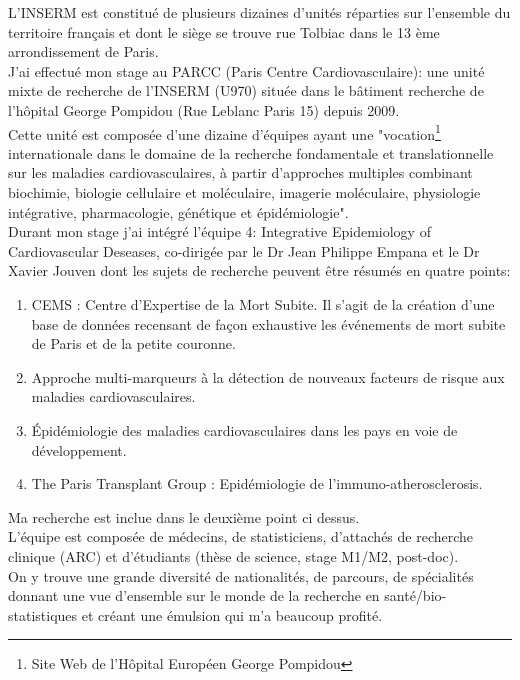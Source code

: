 \documentclass{book}
\begin{document}
\noindent
L'INSERM est constitué de plusieurs dizaines d'unités réparties sur l'ensemble du territoire français et dont le siège se trouve rue Tolbiac dans le 13 ème arrondissement de Paris.\\
J'ai effectué mon stage au PARCC (Paris Centre Cardiovasculaire): une unité mixte de recherche de l'INSERM (U970) située dans le bâtiment recherche de l'hôpital George Pompidou (Rue Leblanc Paris 15) depuis 2009.\\

\noindent
Cette unité est composée d'une dizaine d'équipes ayant une "vocation\footnote{Site Web de l'Hôpital Européen George Pompidou} internationale dans le domaine de la recherche fondamentale et translationnelle sur les maladies cardiovasculaires, à partir d'approches multiples combinant biochimie, biologie cellulaire et moléculaire, imagerie moléculaire, physiologie intégrative, pharmacologie, génétique et épidémiologie".\\

\noindent
Durant mon stage j'ai intégré l'équipe 4: Integrative Epidemiology of Cardiovascular Deseases, co-dirigée par le Dr Jean Philippe Empana et le Dr Xavier Jouven dont les sujets de recherche peuvent être résumés en quatre points:
\noindent
\begin{enumerate}
\item CEMS : Centre d'Expertise de la Mort Subite. Il s'agit de la création d'une base de données recensant de façon exhaustive les événements de mort subite de Paris et de la petite couronne.\\
\item Approche multi-marqueurs à la détection de nouveaux facteurs de risque aux maladies cardiovasculaires.\\
\item Épidémiologie des maladies cardiovasculaires dans les pays en voie de développement.\\
\item The Paris Transplant Group : Epidémiologie de l'immuno-atherosclerosis.\\
\end{enumerate}

Ma recherche est inclue dans le deuxième point ci dessus.\\

\noindent
L'équipe est composée de médecins, de statisticiens, d'attachés de recherche clinique (ARC) et d'étudiants (thèse de science, stage M1/M2, post-doc).\\
On y trouve une grande diversité de nationalités, de parcours, de spécialités donnant une vue d'ensemble sur le monde de la recherche en santé/bio-statistiques et créant une émulsion qui m'a beaucoup profité.\\
\end{document}
